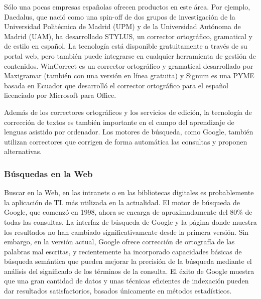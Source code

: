 \begin{multicols}{2}
Sólo una pocas empresas españolas ofrecen productos en este área. Por ejemplo, Daedalus, que nació como una spin-off de dos grupos de investigación de la Universidad Politécnica de Madrid (UPM) y de la Universidad Autónoma de Madrid (UAM), ha desarrollado STYLUS, un corrector ortográfico, gramatical y de estilo en español. La tecnología está disponible gratuitamente a través de su portal web, pero también puede integrarse en cualquier herramienta de gestión de contenidos. WinCorrect es un corrector ortográfico y gramatical desarrollado por Maxigramar (también con una versión en línea gratuita) y Signum es una PYME basada en Ecuador que desarrolló el corrector ortográfico para el español licenciado por Microsoft para Office.

Además de los correctores ortográficos y los servicios de edición, la tecnología de corrección de textos es también importante en el campo del aprendizaje de lenguas asistido por ordenador. Los motores de búsqueda, como Google, también utilizan correctores que corrigen de forma automática las consultas y proponen alternativas.

\subsubsection{Búsquedas en la Web}

Buscar en la Web, en las intranets o en las bibliotecas digitales es probablemente la aplicación de TL más utilizada en la actualidad. El motor de búsqueda de Google, que comenzó en 1998, ahora se encarga de aproximadamente del 80\% de todas las consultas. La interfaz de búsqueda de Google y la página donde muestra los resultados no han cambiado significativamente desde la primera versión. Sin embargo, en la versión actual, Google ofrece corrección de ortografía de las palabras mal escritas, y recientemente ha incorporado capacidades básicas de búsqueda semántica que pueden mejorar la precisión de la búsqueda mediante el análisis del significado de los términos de la consulta. El éxito de Google muestra que una gran cantidad de datos y unas técnicas eficientes de indexación pueden dar resultados satisfactorios, basados únicamente en métodos estadísticos.


\end{multicols}

